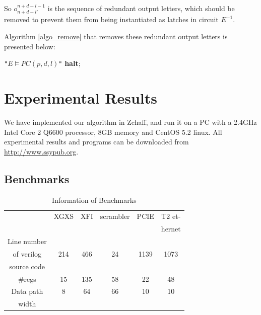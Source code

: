 \documentclass[journal]{IEEEtran}
\begin{document}
So $o_{n+d-l'}^{n+d-l-1}$ is the sequence of redundant output letters,
which should be removed to prevent them from being instantiated as latches in circuit $E^{-1}$.

Algorithm \ref{algo_remove} that removes these redundant output letters is presented below:

\begin{algorithm}
\caption{$RemoveRedundancy(p,d,l')$}
\label{algo_remove}
\begin{algorithmic}[1]
\PRINT \texttt{"$E\vDash PC(p,d,l)$"}
\STATE \textbf{halt};
\ENDIF
\ENDFOR
\end{algorithmic}
\end{algorithm}

\section{Experimental Results}\label{sec_exp}
We have implemented our algorithm in Zchaff\cite{CHAFF},
and run it on a PC with a 2.4GHz Intel Core 2 Q6600 processor, 8GB memory and CentOS 5.2 linux.
All experimental results and programs can be downloaded from \url{http://www.ssypub.org}.
\subsection{Benchmarks}
\begin{table}[t]
\centering
\caption{Information of Benchmarks}
\begin{tabular}{|c|c|c|c|c|c|}
\hline
&XGXS&XFI&scrambler&PCIE&T2 et-\\
&&&&&hernet\\\hline
Line number&&&&&\\
of verilog&214&466&24&1139&1073\\
source code&&&&&\\\hline
\#regs&15&135&58&22&48\\\hline
Data path&8&64&66&10&10\\
width&&&&&\\ \hline
\end{tabular}
\end{table}
\end{document}
